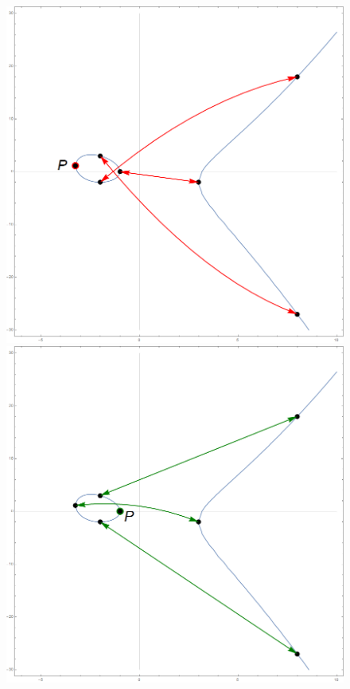 \begin{figure}\centering
\begin{minipage}[t]{0.3\textwidth}
	\includegraphics[width=\textwidth]{figuras/orbitas-puntos-2}
\end{minipage}
\begin{minipage}[t]{0.3\textwidth}
	\includegraphics[width=\textwidth]{figuras/orbitas-puntos-1}

\end{minipage}
\end{figure}
